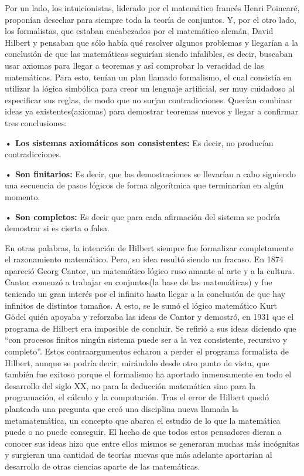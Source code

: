 \documentclass[11pt,letterpaper]{article}
\begin{document}
\vspace{10PT}

Por un lado, los intuicionistas, liderado por el matemático francés Henri Poincaré, proponían desechar para siempre toda la teoría de conjuntos. Y, por el otro lado, los formalistas, que estaban encabezados por el matemático alemán, David Hilbert y pensaban que sólo había qué resolver algunos problemas y llegarían a la conclusión de que las matemáticas seguirían siendo infalibles, es decir, buscaban usar axiomas para llegar a teoremas y así comprobar la veracidad de las matemáticas. Para esto, tenían un plan llamado formalismo, el cual consistía en utilizar la lógica simbólica para crear un lenguaje artificial, ser muy cuidadoso al especificar sus reglas, de modo que no surjan contradicciones. Querían combinar ideas ya existentes(axiomas) para demostrar teoremas nuevos y llegar a confirmar tres conclusiones:

\vspace{10PT}

\textbf{• Los sistemas axiomáticos son consistentes:} Es decir, no producían contradicciones.
\vspace{10PT}

\textbf{• Son finitarios:} Es decir, que las demostraciones se llevarían a cabo siguiendo una secuencia de pasos lógicos de forma algorítmica que terminarían en algún momento.


\vspace{10PT}
\textbf{• Son completos:} Es decir que para cada afirmación del sistema se podría demostrar si es cierta o falsa. 

\vspace{10PT}

En otras palabras, la intención de Hilbert siempre fue formalizar completamente el razonamiento matemático. Pero, su idea resultó siendo un fracaso. En 1874 apareció Georg Cantor, un matemático lógico ruso amante al arte y a la cultura. Cantor comenzó a trabajar en conjuntos(la base de las matemáticas) y fue teniendo un gran interés por el infinito hasta llegar a la conclusión de que hay infinitos de distintos tamaños. A esto, se le sumó el lógico matemático Kurt Gödel quién apoyaba y reforzaba las ideas de Cantor y demostró, en 1931 que el programa de Hilbert era imposible de concluir. Se refirió a sus ideas diciendo que “con procesos finitos ningún sistema puede ser a la vez consistente, recursivo y completo”. Estos contraargumentos echaron a perder el programa formalista de Hilbert, aunque se podría decir, mirándolo desde otro punto de vista, que también fue exitoso porque el formalismo ha aportado inmensamente en todo el desarrollo del siglo XX, no para la deducción matemática sino para la programación, el cálculo y la computación. Tras el error de Hilbert quedó planteada una pregunta que creó una disciplina nueva llamada la metamatemática, un concepto que abarca el estudio de lo que la matemática puede o no puede conseguir. El hecho de que todos estos pensadores dieran a conocer sus ideas hizo que entre ellos mismos se generaran muchas más incógnitas y surgieran una cantidad de teorías nuevas que más adelante aportarían al desarrollo de otras ciencias aparte de las matemáticas.
\end{document}
